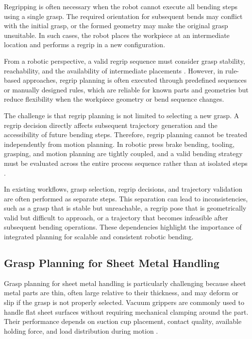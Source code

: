 Regripping is often necessary when the robot cannot execute all bending steps using a single grasp. The required orientation for subsequent bends may conflict with the initial grasp, or the formed geometry may make the original grasp unsuitable. In such cases, the robot places the workpiece at an intermediate location and performs a regrip in a new configuration.

From a robotic perspective, a valid regrip sequence must consider grasp stability, reachability, and the availability of intermediate placements \cite{wan2017regrasp}. However, in rule-based approaches, regrip planning is often executed through predefined sequences or manually designed rules, which are reliable for known parts and geometries but reduce flexibility when the workpiece geometry or bend sequence changes.

The challenge is that regrip planning is not limited to selecting a new grasp. A regrip decision directly affects subsequent trajectory generation and the accessibility of future bending steps. Therefore, regrip planning cannot be treated independently from motion planning. In robotic press brake bending, tooling, grasping, and motion planning are tightly coupled, and a valid bending strategy must be evaluated across the entire process sequence rather than at isolated steps \cite{Gupta1998SheetMetalBending}.

In existing workflows, grasp selection, regrip decisions, and trajectory validation are often performed as separate steps. This separation can lead to inconsistencies, such as a grasp that is stable but unreachable, a regrip pose that is geometrically valid but difficult to approach, or a trajectory that becomes infeasible after subsequent bending operations. These dependencies highlight the importance of integrated planning for scalable and consistent robotic bending.

\subsection{Grasp Planning for Sheet Metal Handling}
\label{subsec:grasp-planning-sheet-metal-handling}

Grasp planning for sheet metal handling is particularly challenging because sheet metal parts are thin, often large relative to their thickness, and may deform or slip if the grasp is not properly selected. Vacuum grippers are commonly used to handle flat sheet surfaces without requiring mechanical clamping around the part. Their performance depends on suction cup placement, contact quality, available holding force, and load distribution during motion \cite{VacuumGripperModeling}.

